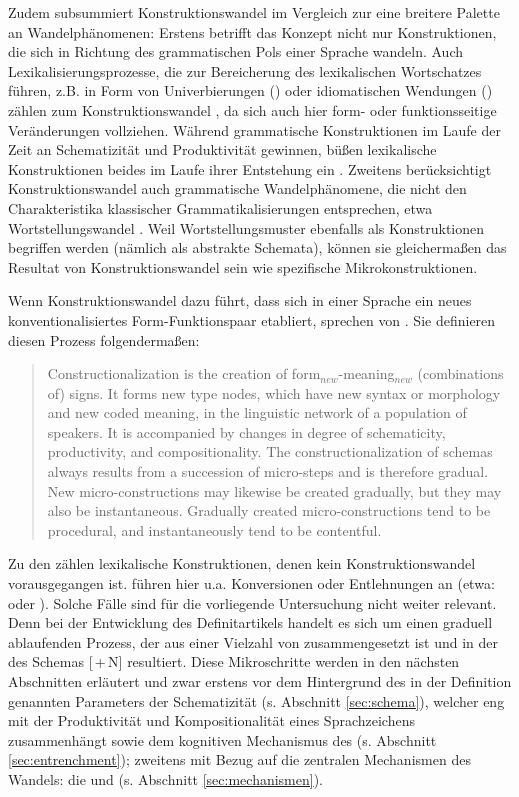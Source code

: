 Zudem subsummiert Konstruktionswandel im Vergleich zur  eine breitere Palette an Wandelphänomenen: Erstens betrifft das Konzept nicht nur Konstruktionen, die sich in Richtung des grammatischen Pols einer Sprache wandeln. Auch Lexikalisierungsprozesse, die zur Bereicherung des lexikalischen Wortschatzes führen, z.B. in Form von Univerbierungen () oder idiomatischen Wendungen () zählen zum Konstruktionswandel \parencite[64]{Hilpert2011}, da sich auch hier form- oder funktionsseitige Veränderungen vollziehen. Während grammatische Konstruktionen im Laufe der Zeit an Schematizität und Produktivität gewinnen, büßen lexikalische Konstruktionen beides im Laufe ihrer Entstehung ein \parencite[vgl.][164]{Traugott2013}. Zweitens berücksichtigt Konstruktionswandel auch grammatische Wandelphänomene, die nicht den Charakteristika klassischer Grammatikalisierungen entsprechen, etwa Wortstellungswandel \parencite[vgl.][65]{Hilpert2011}. Weil Wortstellungsmuster  ebenfalls als Konstruktionen begriffen werden (nämlich als abstrakte Schemata), können sie gleichermaßen das Resultat von Konstruktionswandel sein wie spezifische Mikrokonstruktionen. 

Wenn Konstruktionswandel dazu führt, dass sich in einer Sprache ein neues konventionalisiertes Form-Funktionspaar etabliert, sprechen \textcite{Traugott2013} von . Sie definieren diesen Prozess folgendermaßen:  \blockcquote[22]{Traugott2013}{Constructionalization is the creation of form$_{new}$-meaning$_{new}$ (combinations of) signs. It forms new type nodes, which have new syntax or morphology and new coded meaning, in the linguistic network of a population of speakers. It is accompanied by changes in degree of schematicity,
productivity, and compositionality. The constructionalization of schemas
always results from a succession of micro-steps and is therefore gradual.
New micro-constructions may likewise be created gradually, but they may
also be instantaneous. Gradually created micro-constructions tend to be
procedural, and instantaneously tend to be
contentful.}

\noindent
Zu den  zählen lexikalische Konstruktionen, denen kein Konstruktionswandel vorausgegangen ist. \textcite[3]{Traugott2013} führen hier u.a. Konversionen oder Entlehnungen an (etwa:  oder ). Solche Fälle sind für die vorliegende Untersuchung nicht weiter relevant. Denn bei der Entwicklung des Definitartikels handelt es sich um einen graduell ablaufenden Prozess, der aus einer Vielzahl von  zusammengesetzt ist und in der  des Schemas  [\,+\,N]  resultiert. Diese Mikroschritte werden in den nächsten Abschnitten erläutert und zwar erstens vor dem Hintergrund des in der Definition genannten Parameters der Schematizität (s. Abschnitt \ref{sec:schema}), welcher eng mit der Produktivität und Kompositionalität eines Sprachzeichens zusammenhängt sowie dem kognitiven Mechanismus des   (s.  Abschnitt \ref{sec:entrenchment}); zweitens mit Bezug auf die zentralen Mechanismen des Wandels: die  und  (s. Abschnitt \ref{sec:mechanismen}). 

